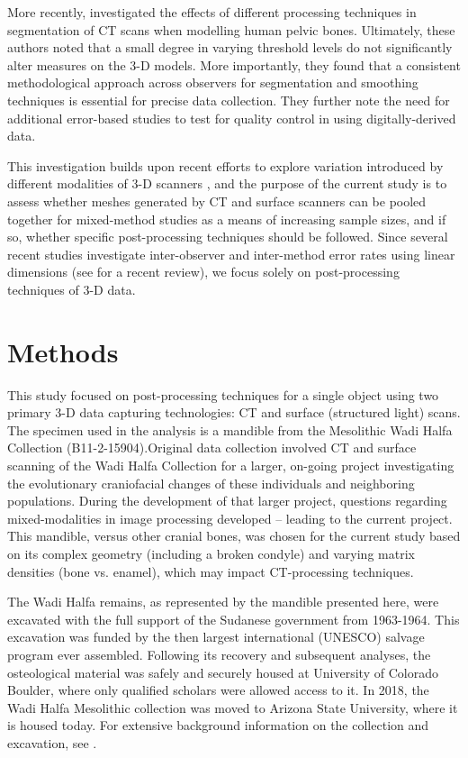 \documentclass[review]{elsarticle}
\begin{document}
More recently, \citet{RN8984} investigated the effects of different processing techniques in segmentation of CT scans when modelling human pelvic bones. Ultimately, these authors noted that a small degree in varying threshold levels do not significantly alter measures on the 3-D models. More importantly, they found that a consistent methodological approach across observers for segmentation and smoothing techniques is essential for precise data collection. They further note the need for additional error-based studies to test for quality control in using digitally-derived data.

This investigation builds upon recent efforts to explore variation introduced by different modalities of 3-D scanners \citep{RN11522}, and the purpose of the current study is to assess whether meshes generated by CT and surface scanners can be pooled together for mixed-method studies as a means of increasing sample sizes, and if so, whether specific post-processing techniques should be followed. Since several recent studies investigate inter-observer and inter-method error rates using linear dimensions (see \citealt{RN11945} for a recent review), we focus solely on post-processing techniques of 3-D data. 

\section{Methods}

This study focused on post-processing techniques for a single object using two primary 3-D data capturing technologies: CT and surface (structured light) scans. The specimen used in the analysis is a mandible from the Mesolithic Wadi Halfa Collection  (B11-2-15904).Original data collection involved CT and surface scanning of the Wadi Halfa Collection for a larger, on-going project investigating the evolutionary craniofacial changes of these individuals and neighboring populations. During the development of that larger project, questions regarding mixed-modalities in image processing developed -- leading to the current project. This  mandible, versus other cranial bones, was chosen for the current study based on its complex geometry (including a broken condyle) and varying matrix densities (bone vs. enamel), which may impact CT-processing techniques.

The Wadi Halfa remains, as represented by the mandible presented here, were excavated with the full support of the Sudanese government from 1963-1964. This excavation was funded by the then largest international (UNESCO) salvage program ever assembled. Following its recovery and subsequent analyses, the osteological material was safely and securely housed at University of Colorado Boulder, where only qualified scholars were allowed access to it. In 2018, the Wadi Halfa Mesolithic collection was moved to Arizona State University, where it is housed today. For extensive background information on the collection and excavation, see \citet{wadi}.
\end{document}
